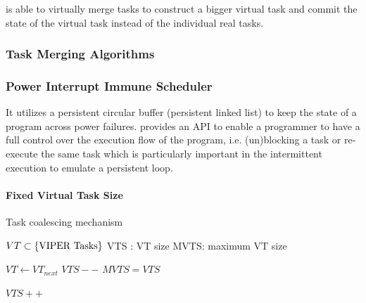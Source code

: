 \sys is able to virtually merge tasks to construct a bigger virtual task and commit the state of the virtual task instead of the individual real tasks. 

\subsubsection{Task Merging Algorithms}



\subsubsection{Power Interrupt Immune Scheduler}


It utilizes a persistent circular buffer (persistent linked list) to keep the state of a program across power failures. \sys provides an API to enable a programmer to have a full control over the execution flow of the program, i.e. (un)blocking a task or re-execute the same task which is particularly important in the intermittent execution to emulate a persistent loop. 

\paragraph{Fixed Virtual Task Size}

	\begin{algorithm}
		\caption{Task coalescing mechanism}
		\label{algo:fixVirtTask}
		\scriptsize
		\begin{algorithmic}[1]
			\State $VT \subset \text{\{\sys Tasks\}} $  
			\State VTS : VT size
			\State MVTS: maximum VT size 
			\vspace{0.1cm}

				\State $VT \leftarrow VT_{next}$
				\vspace{0.1cm}
							\State $VTS--$  
							\State $ MVTS = VTS $ 
						\EndIf
				\EndWhile

				\vspace{0.1cm}
					 
					\State $VTS++$
					\EndIf
				\EndIf
			\EndWhile
		\end{algorithmic}
	\end{algorithm}

